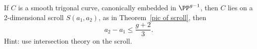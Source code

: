 \begin{exercise}\label{Maroni Bound}
If $C$ is a smooth trigonal curve, canonically embedded in $\PP^{g-1}$,
then $C$ lies on a 2-dimensional scroll $S(a_1, a_2)$, as in Theorem~\ref{pic of scroll},
then 
$$
a_2-a_1\leq \frac{g+2}{3}.
$$
Hint: use intersection theory on the scroll.
\end{exercise}

%





